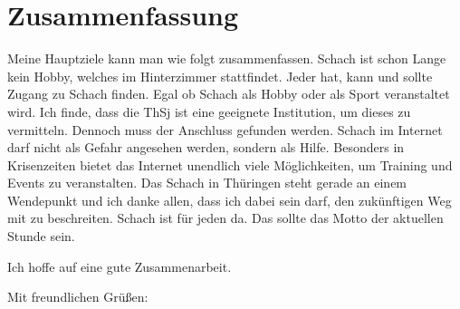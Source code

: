 \documentclass[letterpaper,12pt]{article}
\begin{document}
\clearpage

\section{Zusammenfassung}
Meine Hauptziele kann man wie folgt zusammenfassen. Schach ist schon Lange kein Hobby, welches im Hinterzimmer stattfindet. Jeder hat, kann und sollte Zugang zu Schach finden. Egal ob Schach als Hobby oder als Sport veranstaltet wird. Ich finde, dass die ThSj ist eine geeignete Institution, um dieses zu vermitteln. Dennoch muss der Anschluss gefunden werden. Schach im Internet darf nicht als Gefahr angesehen werden, sondern als Hilfe. Besonders in Krisenzeiten bietet das Internet unendlich viele Möglichkeiten, um Training und Events zu veranstalten. Das Schach in Thüringen steht gerade an einem Wendepunkt und ich danke allen, dass ich dabei sein darf, den zukünftigen Weg mit zu beschreiten. Schach ist für jeden da. Das sollte das Motto der aktuellen Stunde sein.


\vspace{1.5cm}

Ich hoffe auf eine gute Zusammenarbeit.

\vspace{2.25cm}
Mit freundlichen Grüßen: \\ 
\vspace{2cm}

	
\end{document}
